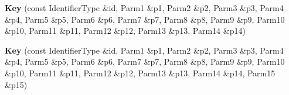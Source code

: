 \begin{DoxyCompactItemize}
\item 
\hypertarget{classLoki_1_1Key_a518a2fb8398504bc00a003b842eadb2b}{}{\bfseries Key} (const Identifier\+Type \&id, Parm1 \&p1, Parm2 \&p2, Parm3 \&p3, Parm4 \&p4, Parm5 \&p5, Parm6 \&p6, Parm7 \&p7, Parm8 \&p8, Parm9 \&p9, Parm10 \&p10, Parm11 \&p11, Parm12 \&p12, Parm13 \&p13, Parm14 \&p14)\label{classLoki_1_1Key_a518a2fb8398504bc00a003b842eadb2b}

\item 
\hypertarget{classLoki_1_1Key_a325e7510c83d476334c5ad33ff1d3403}{}{\bfseries Key} (const Identifier\+Type \&id, Parm1 \&p1, Parm2 \&p2, Parm3 \&p3, Parm4 \&p4, Parm5 \&p5, Parm6 \&p6, Parm7 \&p7, Parm8 \&p8, Parm9 \&p9, Parm10 \&p10, Parm11 \&p11, Parm12 \&p12, Parm13 \&p13, Parm14 \&p14, Parm15 \&p15)\label{classLoki_1_1Key_a325e7510c83d476334c5ad33ff1d3403}

\end{DoxyCompactItemize}
